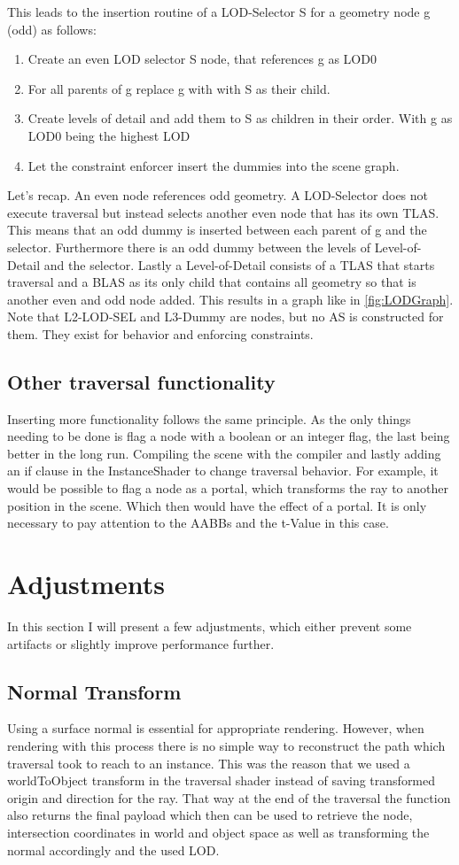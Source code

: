 \newpage
This leads to the insertion routine of a LOD-Selector S for a geometry node g (odd) as follows:
\begin{enumerate}
    \item Create an even LOD selector S node, that references g as LOD0
    \item For all parents of g replace g with with S as their child.
    \item Create levels of detail and add them to S as children in their order. With g as LOD0 being the highest LOD
    \item Let the constraint enforcer insert the dummies into the scene graph.
\end{enumerate}
Let's recap. An even node references odd geometry. A LOD-Selector does not execute traversal but instead selects another even node that has its own TLAS. This means that an odd dummy is inserted between each parent of g and the selector. Furthermore there is an odd dummy between the levels of Level-of-Detail and the selector. Lastly a Level-of-Detail consists of a TLAS that starts traversal and a BLAS as its only child that contains all geometry so that is another even and odd node added. This results in a graph like in \ref{fig:LODGraph}. Note that L2-LOD-SEL and L3-Dummy are nodes, but no AS is constructed for them. They exist for behavior and enforcing constraints.
\subsection{Other traversal functionality}
\label{sec:ImplOther}
Inserting more functionality follows the same principle. As the only things needing to be done is flag a node with a boolean or an integer flag, the last being better in the long run. Compiling the scene with the compiler and lastly adding an if clause in the InstanceShader to change traversal behavior. For example, it would be possible to flag a node as a portal, which transforms the ray to another position in the scene. Which then would have the effect of a portal. It is only necessary to pay attention to the AABBs and the t-Value in this case.
\section{Adjustments}
In this section I will present a few adjustments, which either prevent some artifacts or slightly improve performance further.
\subsection{Normal Transform}
\label{sec:NormalTransform}
Using a surface normal is essential for appropriate rendering. However, when rendering with this process there is no simple way to reconstruct the path which traversal took to reach to an instance. This was the reason that we used a worldToObject transform in the traversal shader instead of saving transformed origin and direction for the ray. That way at the end of the traversal the function also returns the final payload which then can be used to retrieve the node, intersection coordinates in world and object space as well as transforming the normal accordingly and the used LOD.
